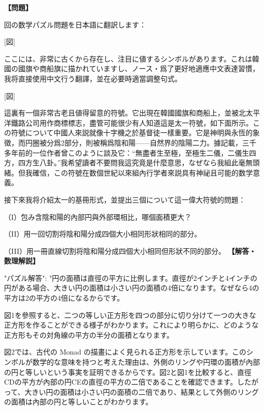 \documentclass[10pt,a4paper,oneside,openany]{ltjsbook}
\begin{document}
\begin{tcolorbox}[colback=softblue,colframe=primaryblue,title=\textbf{第 158 問：THE GREAT MONAD.},arc=2mm,boxrule=1pt,breakable]
\textbf{【問題】}\par\vspace{0.3em}
回の数学パズル問題を日本語に翻訳します：

[図]

ここには、非常に古くから存在し、注目に値するシンボルがあります。これは韓國の國旗や商船旗に描かれていますし、ノース・爲了更好地適應中文表達習慣，我将直接使用中文行う翻譯，並在必要時適當調整句式。

[図]

這裏有一個非常古老且値得留意的符號。它出現在韓國國旗和商船上，並被北太平洋鐵路公司用作商標標志，盡管可能很少有人知道這是太一符號，如下面所示。この符號について中國人來説就像十字機之於基督徒一樣重要。它是神明與永恆的象徵，而円圈被分爲2部分，則被稱爲陰和陽——自然界的陰陽二力。據記載，三千多年前的一位作者曾このように談及它：“無盡者生至極，至極生二儀，二儀生四方，四方生八卦。”我希望讀者不要問我這究竟是什麼意思，なぜなら我組此毫無頭緒。但我確信，この符號在数個世紀以來組內行学者來説具有神祕且可能的数学意義。

接下來我将介紹太一的基冊形式，並提出三個について這一偉大符號的問題：

（I）包み含陰和陽的內部円與外部環相比，哪個面積更大？

（II）用一回切割将陰和陽分成四個大小相同形狀相同的部分。

（III）用一冊直線切割将陰和陽分成四個大小相同但形狀不同的部分。
\tcblower
\textbf{【解答・数理解説】}\par\vspace{0.3em}
{
"パズル解答": "円の面積は直徑の平方に比例します。直徑が2インチと4インチの円がある場合、大きい円の面積は小さい円の面積の4倍になります。なぜなら4の平方は2の平方の4倍になるからです。

図1を參照すると、二つの等しい正方形を四つの部分に切り分けて一つの大きな正方形を作ることができる様子がわかります。これにより明らかに、どのような正方形もその対角線の平方の半分の面積となります。

図2では、古代の Monad の描畫によく見られる正方形を示しています。このシンボルが数学的な意味を持つと考えた理由は、外側のリングや円環の面積が內部の円と等しいという事実を証明できるからです。図2と図1を比較すると、直徑CDの平方が內部の円CEの直徑の平方の二倍であることを確認できます。したがって、大きい円の面積は小さい円の面積の二倍であり、結果として外側のリングの面積は內部の円と等しいことがわかります。

}
\end{tcolorbox}
\end{document}
